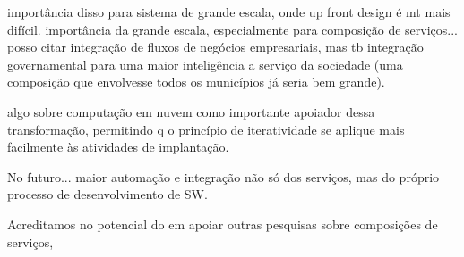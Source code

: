 importância disso para sistema de grande escala, onde up front design é mt mais difícil.
importância da grande escala, especialmente para composição de serviços...
posso citar integração de fluxos de negócios empresariais,
mas tb integração governamental para uma maior inteligência a serviço da sociedade
(uma composição que envolvesse todos os municípios já seria bem grande).

algo sobre computação em nuvem como importante apoiador dessa transformação,
permitindo q o princípio de iteratividade se aplique mais facilmente
às atividades de implantação.

No futuro... maior automação e integração não só dos serviços,
mas do próprio processo de desenvolvimento de SW.

Acreditamos no potencial do \ee em apoiar outras pesquisas
sobre composições de serviços,


